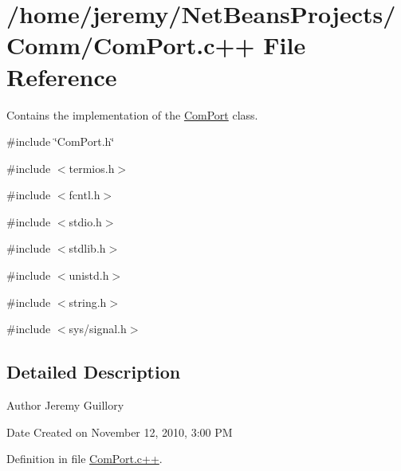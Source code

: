 \hypertarget{_com_port_8c_09_09}{
\section{/home/jeremy/NetBeansProjects/Comm/ComPort.c++ File Reference}
\label{_com_port_8c_09_09}
}


Contains the implementation of the \hyperlink{class_com_port}{ComPort} class.  


{\ttfamily \#include \char`\"{}ComPort.h\char`\"{}}\par
{\ttfamily \#include $<$termios.h$>$}\par
{\ttfamily \#include $<$fcntl.h$>$}\par
{\ttfamily \#include $<$stdio.h$>$}\par
{\ttfamily \#include $<$stdlib.h$>$}\par
{\ttfamily \#include $<$unistd.h$>$}\par
{\ttfamily \#include $<$string.h$>$}\par
{\ttfamily \#include $<$sys/signal.h$>$}\par


\subsection{Detailed Description}
\begin{DoxyAuthor}{Author}
Jeremy Guillory 
\end{DoxyAuthor}
\begin{DoxyDate}{Date}
Created on November 12, 2010, 3:00 PM 
\end{DoxyDate}


Definition in file \hyperlink{_com_port_8c_09_09_source}{ComPort.c++}.

